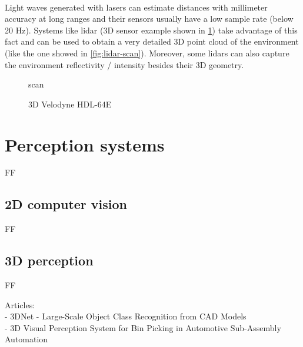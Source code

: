 \paragraph{}

Light waves generated with lasers can estimate distances with millimeter accuracy at long ranges and their sensors usually have a low sample rate (below 20 Hz). Systems like \gls{lidar} (3D sensor example shown in \cref{fig:velodyne-hdl-64e}) take advantage of this fact and can be used to obtain a very detailed 3D point cloud of the environment (like the one showed in \cref{fig:lidar-scan}). Moreover, some \glspl{lidar} can also capture the environment reflectivity / intensity besides their 3D geometry.

\begin{figure}[H]
	\begin{floatrow}[2]
		{\caption[ scan]{ scan\protect\footnotemark}\label{fig:lidar-scan}}
		{\caption[3D Velodyne HDL-64E]{3D Velodyne HDL-64E\protect\footnotemark}\label{fig:velodyne-hdl-64e}}
	\end{floatrow}
\end{figure}


\section{Perception systems}

FF

\subsection{2D computer vision}

FF


\subsection{3D perception}

FF

Articles:\\
- 3DNet - Large-Scale Object Class Recognition from CAD Models\\
- 3D Visual Perception System for Bin Picking in Automotive Sub-Assembly Automation


